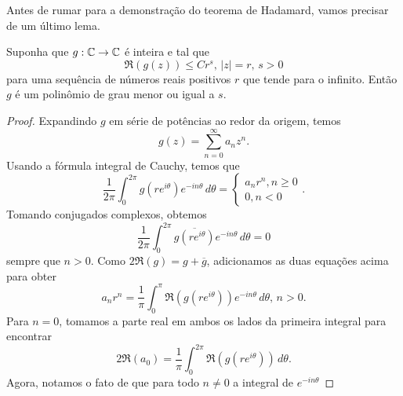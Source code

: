     Antes de rumar para a demonstração do teorema de Hadamard, vamos precisar de um último
    lema.
    \begin{lema}
    \label{lema:5.5-Stein}
        Suponha que $g:\mathbb{C}\to\mathbb{C}$ é inteira e tal que
        \begin{equation*}
            \Re(g(z)) \leq C r^s, \, |z| = r, \, s > 0
        \end{equation*}
        para uma sequência de números reais positivos $r$ que tende para o infinito.
        Então $g$ é um polinômio de grau menor ou igual a $s$.
    \end{lema}
    \begin{proof}
        Expandindo $g$ em série de potências ao redor da origem, temos
        \begin{equation*}
            g(z) = \sum_{n=0}^{\infty} a_n z^n.
        \end{equation*}
        Usando a fórmula integral de Cauchy, temos que
        \begin{equation*}
            \frac{1}{2\pi} \int_0^{2\pi} g(re^{i\theta}) e^{-in\theta} \, d\theta
            =
            \begin{cases}
                a_n r^n, n \geq 0 \\
                0, n < 0
            \end{cases}.
        \end{equation*}
        Tomando conjugados complexos, obtemos
        \begin{equation*}
            \frac{1}{2\pi} \int_0^{2\pi} \overline{ g(re^{i\theta}) } e^{-in\theta} \, d\theta = 0
        \end{equation*}
        sempre que $n > 0$. Como $2\Re(g) = g + \overline{g}$, adicionamos as duas equações
        acima para obter
        \begin{equation*}
            a_n r^n = \frac{1}{\pi} \int_0^{\pi} \Re(g(re^{i\theta}))e^{-in\theta} \, d\theta,
            \, n > 0.
        \end{equation*}
        Para $n = 0$, tomamos a parte real em ambos os lados da primeira integral para encontrar
        \begin{equation*}
            2\Re(a_0) = \frac{1}{\pi}\int_0^{2\pi} \Re(g(re^{i\theta})) \, d\theta.
        \end{equation*}
        Agora, notamos o fato de que para todo $n\neq 0$ a integral de $e^{-in\theta}$

\end{proof}
